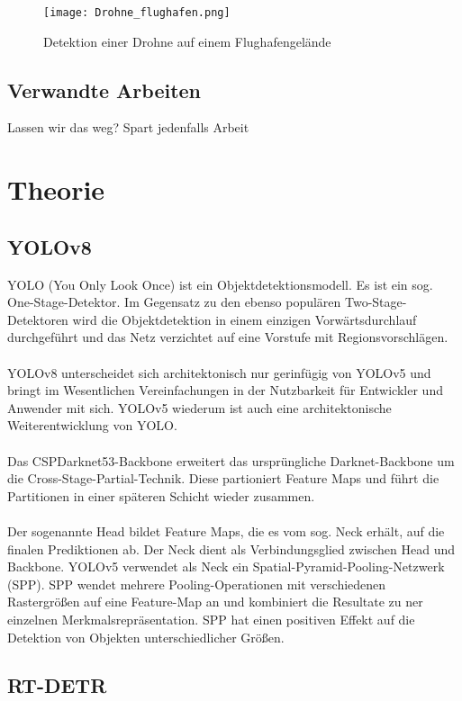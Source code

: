 \documentclass[runningheads]{llncs}
\begin{document}
\begin{figure}
    \centering
    \texttt{[image: Drohne\_flughafen.png]}
    \caption{Detektion einer Drohne auf einem Flughafengelände}
\end{figure}
\FloatBarrier

\subsection{Verwandte Arbeiten}

Lassen wir das weg? Spart jedenfalls Arbeit

\section{Theorie}

\subsection{YOLOv8}
YOLO \cite{YOLO} (You Only Look Once) ist ein Objektdetektionsmodell. Es ist ein sog. One-Stage-Detektor. Im Gegensatz zu den ebenso populären Two-Stage-Detektoren wird die Objektdetektion in einem einzigen Vorwärtsdurchlauf durchgeführt und das Netz verzichtet auf eine Vorstufe mit Regionsvorschlägen.\\\\
YOLOv8 unterscheidet sich architektonisch nur gerinfügig von YOLOv5 und bringt im Wesentlichen Vereinfachungen in der Nutzbarkeit für Entwickler und Anwender mit sich. YOLOv5 wiederum ist auch eine architektonische Weiterentwicklung von YOLO.\cite{YOLOv5}\\\\ Das CSPDarknet53-Backbone erweitert das ursprüngliche Darknet-Backbone um die Cross-Stage-Partial-Technik. Diese partioniert Feature Maps und führt die Partitionen in einer späteren Schicht wieder zusammen.\\\\ Der sogenannte Head bildet Feature Maps, die es vom sog. Neck erhält, auf die finalen Prediktionen ab. Der Neck dient als Verbindungsglied zwischen Head und Backbone. YOLOv5 verwendet als Neck ein Spatial-Pyramid-Pooling-Netzwerk (SPP). SPP wendet mehrere Pooling-Operationen mit verschiedenen Rastergrößen auf eine Feature-Map an und kombiniert die Resultate zu ner einzelnen Merkmalsrepräsentation. SPP hat einen positiven Effekt auf die Detektion von Objekten unterschiedlicher Größen. 


\subsection{RT-DETR}
\end{document}
